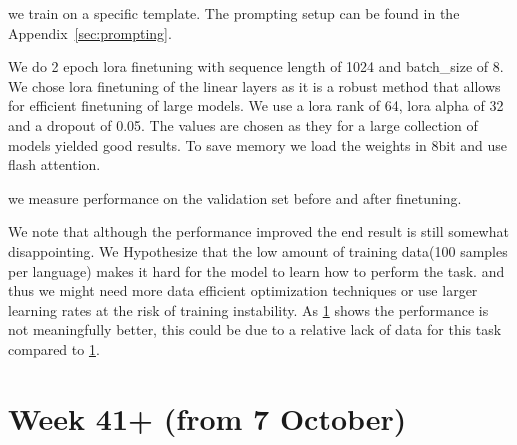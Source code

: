 \documentclass[11pt]{article}
\begin{document}
we train on a specific template. The prompting setup can be found in the Appendix~\vref{sec:prompting}.

We do 2 epoch lora finetuning \cite{hu2021loralowrankadaptationlarge} with sequence length of 1024 and batch\_size of 8. We chose lora finetuning of the linear layers as it is a robust method that allows for efficient finetuning of large models.
We use a lora rank of 64, lora alpha of 32 and a dropout of 0.05. The values are chosen as they for a large collection of models yielded good results.
To save memory we load the weights in 8bit and use flash attention.

we measure performance on the validation set before and after finetuning.
\begin{table}[ht]
    \centering
\end{table}

We note that although the performance improved the end result is still somewhat disappointing.
We Hypothesize that the low amount of training data(100 samples per language) makes it hard for the model to learn how to perform the task. 
and thus we might need more data efficient optimization techniques or use larger learning rates at the risk of training instability.
As \ref{sec:week41} shows the performance is not meaningfully better, this could be due to a relative lack of data for this task compared to \ref{sec:week41}.


\section{Week 41+ (from 7 October)}
\label{sec:week41}
\end{document}
